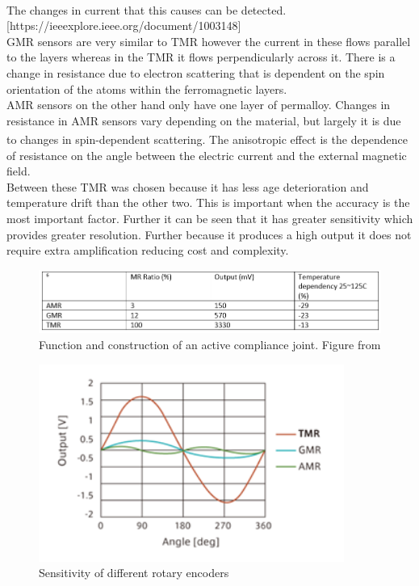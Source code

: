\documentclass[11pt]{article}		%
\newcommand{\supercite}[1]{\textsuperscript{\cite{#1}}}		%
\begin{document}
            The changes in current that this causes can be detected.\supercite{explanation_magntoresistance1} [https://ieeexplore.ieee.org/document/1003148]
            \\
            GMR sensors are very similar to TMR however the current in these flows parallel to the layers whereas in the TMR it flows perpendicularly across it.
            There is a change in resistance due to electron scattering that is dependent on the spin orientation of the atoms within the ferromagnetic layers.
            \\
            AMR sensors on the other hand only have one layer of permalloy. 
            Changes in resistance in AMR sensors vary depending on the material, but largely it is due to changes in spin-dependent scattering. \supercite{explanation_magntoresistance2}
            The anisotropic effect is the dependence of resistance on the angle between the electric current and the external magnetic field.
            \\
            Between these TMR was chosen because it has less age deterioration and temperature drift than the other two.
            This is important when the accuracy is the most important factor. 
            Further it can be seen that it has greater sensitivity which provides greater resolution. Further because it produces a high output it does not require extra amplification reducing cost and complexity. 
            
            \begin{figure}[h]
					\centering
						\includegraphics[width=15cm] {table_showing_different_rotary_encoders.PNG}
						\caption{Function and construction of an active compliance joint. Figure from \cite{Comparison_TMR_AMR}}
						\label{rotary_encoders_comparison}
				\end{figure}
				
				  \begin{figure}[h]
					\centering
						\includegraphics[width=10cm] {Graph_of_different_rotary_encoders}
						\caption{Sensitivity of different rotary encoders \cite{TMR_graph}}
						\label{rotary_encoders_graph}
				\end{figure}
\end{document}
